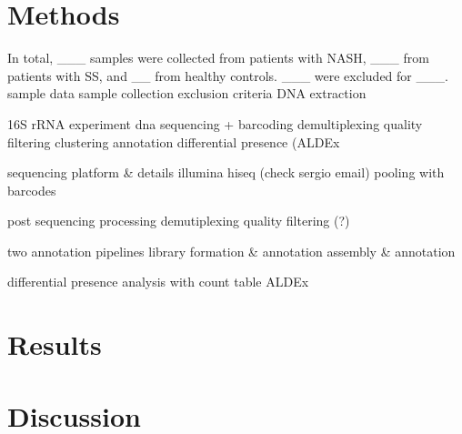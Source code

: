 \FloatBarrier

\section{Methods}
In total, ___ samples were collected from patients with NASH, ___ from patients with SS, and __ from healthy controls. ___ were excluded for ___.
sample data
sample collection
exclusion criteria
DNA extraction

16S rRNA experiment
dna sequencing + barcoding
demultiplexing
quality filtering
clustering
annotation
differential presence (ALDEx

sequencing platform & details
illumina hiseq (check sergio email)
pooling with barcodes

post sequencing processing
demutiplexing
quality filtering (?)

two annotation pipelines
library formation & annotation
assembly & annotation

differential presence analysis with count table
ALDEx
\section{Results}
\section{Discussion}